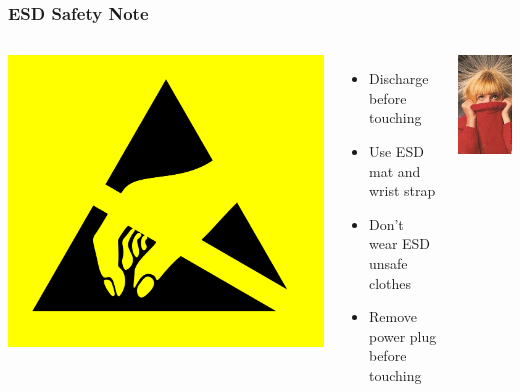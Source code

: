 \documentclass[aspectratio=169]{beamer}
\begin{document}
\begin{frame}
  \frametitle{ESD Safety Note}
  \begin{columns}
      \begin{center}
        \includegraphics[scale=0.05]{images/esd01.png}
      \end{center}
      \begin{itemize}
        \item Discharge before touching
        \item Use ESD mat and wrist strap
        \item Don't wear ESD unsafe clothes
        \item Remove power plug before touching
      \end{itemize}
      \begin{center}
        \includegraphics[scale=0.55]{images/esd03.jpg}
      \end{center}
  \end{columns}
\end{frame}
\end{document}
